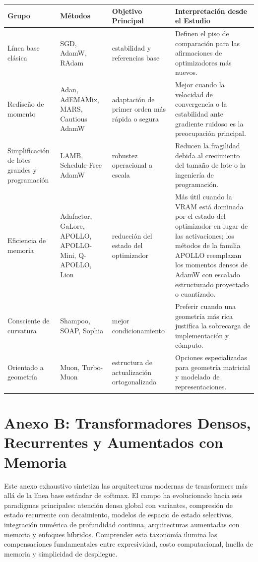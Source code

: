 \documentclass[11pt,a4paper]{article}
\begin{document}
\small
\begin{longtable}{p{2.5cm}p{3.5cm}p{2.0cm}p{5.3cm}}
\toprule
\textbf{Grupo} & \textbf{Métodos} & \textbf{Objetivo Principal} & \textbf{Interpretación desde el Estudio} \\
\midrule
\endhead
Línea base clásica & SGD, AdamW, RAdam & estabilidad y referencias base & Definen el piso de comparación para las afirmaciones de optimizadores más nuevos. \\
Rediseño de momento & Adan, AdEMAMix, MARS, Cautious AdamW & adaptación de primer orden más rápida o segura & Mejor cuando la velocidad de convergencia o la estabilidad ante gradiente ruidoso es la preocupación principal. \\
Simplificación de lotes grandes y programación & LAMB, Schedule-Free AdamW & robustez operacional a escala & Reducen la fragilidad debida al crecimiento del tamaño de lote o la ingeniería de programación. \\
Eficiencia de memoria & Adafactor, GaLore, APOLLO, APOLLO-Mini, Q-APOLLO, Lion & reducción del estado del optimizador & Más útil cuando la VRAM está dominada por el estado del optimizador en lugar de las activaciones; los métodos de la familia APOLLO reemplazan los momentos densos de AdamW con escalado estructurado proyectado o cuantizado. \\
Consciente de curvatura & Shampoo, SOAP, Sophia & mejor condicionamiento & Preferir cuando una geometría más rica justifica la sobrecarga de implementación y cómputo. \\
Orientado a geometría & Muon, Turbo-Muon & estructura de actualización ortogonalizada & Opciones especializadas para geometría matricial y modelado de representaciones. \\
\bottomrule
\end{longtable}
\normalsize

\section{Anexo B: Transformadores Densos, Recurrentes y Aumentados con Memoria}
\label{sec:annex-transformer}

Este anexo exhaustivo sintetiza las arquitecturas modernas de transformers más allá de la línea base estándar de softmax. El campo ha evolucionado hacia seis paradigmas principales: atención densa global con variantes, compresión de estado recurrente con decaimiento, modelos de espacio de estado selectivos, integración numérica de profundidad continua, arquitecturas aumentadas con memoria y enfoques híbridos. Comprender esta taxonomía ilumina las compensaciones fundamentales entre expresividad, costo computacional, huella de memoria y simplicidad de despliegue.
\end{document}
